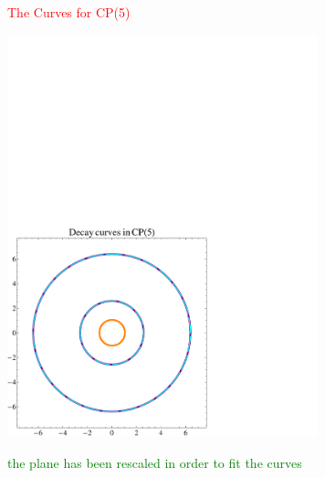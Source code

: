 \documentclass[12pt,letterpaper,landscape,KOMA,smallheadings,calcdimensions,display]{powersem}
\begin{document}
\begin{slide}

\centerline{\textcolor{red}{\Large The Curves for CP(5)}}

\vspace{-4.5cm}
\begin{center}
\hspace{2.5cm}
\includegraphics[width=9.0cm]{ccp5.pdf}
\end{center}

\centerline{\textcolor{green}{\small the plane has been rescaled in order to fit the curves}}

\end{slide}
\end{document}
